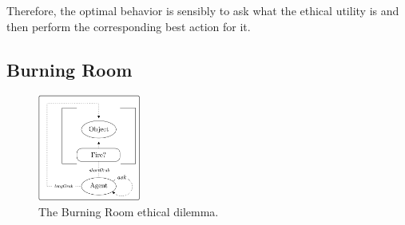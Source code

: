 \documentclass[11pt]{article}
\begin{document}
{Therefore, the optimal behavior is sensibly to ask what the ethical utility is and then perform the corresponding best action for it.



\subsection{Burning Room}

\begin{figure}
\centering
\includegraphics[width=0.30\textwidth]{figures/burning_room.png}
\caption{The Burning Room ethical dilemma.}
\label{fig:burning_room}
\end{figure}

}
\end{document}

